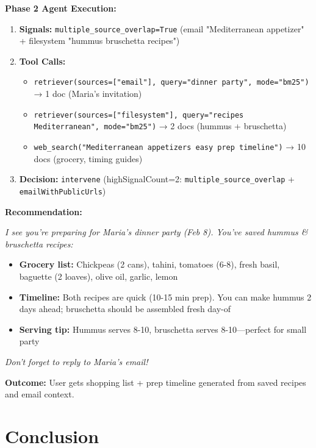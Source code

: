 \documentclass[11pt,a4paper]{article}
\begin{document}
\textbf{Phase 2 Agent Execution:}
\begin{enumerate}[leftmargin=*]
    \item \textbf{Signals:} \texttt{multiple\_source\_overlap=True} (email "Mediterranean appetizer" + filesystem "hummus bruschetta recipes")
    \item \textbf{Tool Calls:}
    \begin{itemize}
        \item \texttt{retriever(sources=["email"], query="dinner party", mode="bm25")} → 1 doc (Maria's invitation)
        \item \texttt{retriever(sources=["filesystem"], query="recipes Mediterranean", mode="bm25")} → 2 docs (hummus + bruschetta)
        \item \texttt{web\_search("Mediterranean appetizers easy prep timeline")} → 10 docs (grocery, timing guides)
    \end{itemize}
    \item \textbf{Decision:} \texttt{intervene} (highSignalCount=2: \texttt{multiple\_source\_overlap} + \texttt{emailWithPublicUrls})
\end{enumerate}

\textbf{Recommendation:}
\begin{tcolorbox}[colback=green!5,colframe=green!80]
\textit{I see you're preparing for Maria's dinner party (Feb 8). You've saved hummus \& bruschetta recipes:}
\begin{itemize}
    \item \textbf{Grocery list:} Chickpeas (2 cans), tahini, tomatoes (6-8), fresh basil, baguette (2 loaves), olive oil, garlic, lemon
    \item \textbf{Timeline:} Both recipes are quick (10-15 min prep). You can make hummus 2 days ahead; bruschetta should be assembled fresh day-of
    \item \textbf{Serving tip:} Hummus serves 8-10, bruschetta serves 8-10—perfect for small party
\end{itemize}
\textit{Don't forget to reply to Maria's email!}
\end{tcolorbox}

\textbf{Outcome:} User gets shopping list + prep timeline generated from saved recipes and email context.



\section{Conclusion}
\end{document}

